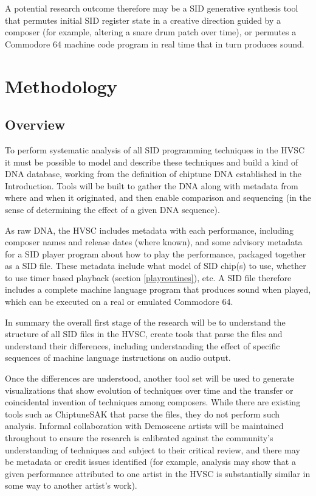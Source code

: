 \documentclass[10pt]{article}
\begin{document}
\begin{multicols*}{2}
A potential research outcome therefore may be a SID generative synthesis tool that permutes initial SID register state in a creative direction guided by a composer (for example, altering a snare drum patch over time), or permutes a Commodore 64 machine code program in real time that in turn produces sound.

\section{Methodology}
\label{methodology}

    \subsection{Overview}

To perform systematic analysis of all SID programming techniques in the HVSC it must be possible to model and describe these techniques and build a kind of DNA database, working from the definition of chiptune DNA established in the Introduction. Tools will be built to gather the DNA along with metadata from where and when it originated, and then enable comparison and sequencing (in the sense of determining the effect of a given DNA sequence).

As raw DNA, the HVSC includes metadata with each performance, including composer names and release dates (where known), and some advisory metadata for a SID player program about how to play the performance, packaged together as a SID file\cite{sidfile}. These metadata include what model of SID chip(s) to use, whether to use timer based playback (section \ref{playroutines}), etc. A SID file therefore includes a complete machine language program that produces sound when played, which can be executed on a real or emulated Commodore 64.

In summary the overall first stage of the research will be to understand the structure of all SID files in the HVSC, create tools that parse the files and understand their differences, including understanding the effect of specific sequences of machine language instructions on audio output.

Once the differences are understood, another tool set will be used to generate visualizations that show evolution of techniques over time and the transfer or coincidental invention of techniques among composers. While there are existing tools such as ChiptuneSAK\cite{ChiptuneSAK} that parse the files, they do not perform such analysis. Informal collaboration with Demoscene artists will be maintained throughout to ensure the research is calibrated against the community’s understanding of techniques and subject to their critical review, and there may be metadata or credit issues identified (for example, analysis may show that a given performance attributed to one artist in the HVSC is substantially similar in some way to another artist's work).


\end{multicols*}
\end{document}
